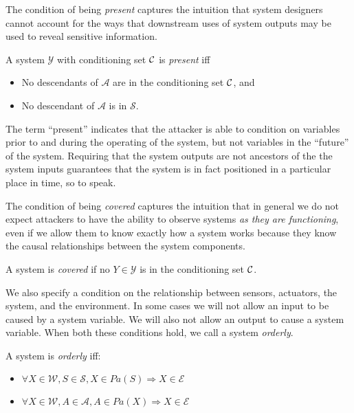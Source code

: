 \documentclass[../thesis.tex]{subfiles}
\begin{document}
The condition of being \emph{present} captures the
intuition that system designers cannot account for
the ways that downstream uses of system outputs
may be used to reveal sensitive information.

\begin{dfn}[Present]
  A system $\mathcal{Y}$ with conditioning set $\mathcal{C}$ is \emph{present}
   iff
  \begin{itemize}
  \item No descendants of $\mathcal{A}$ are in the
    conditioning set $\mathcal{C}$, and
  \item No descendant of $\mathcal{A}$ is in
    $\mathcal{S}$.
  \end{itemize}
\end{dfn}

The term ``present'' indicates that the attacker
is able to condition on variables prior to and
during the operating of the system, but not
variables in the ``future'' of the system.
Requiring that the system outputs are not ancestors of
the the system inputs guarantees that the system is
in fact positioned in a particular place in time,
so to speak.

The condition of being \emph{covered} captures the intuition
that in general we do not expect attackers to have
the ability to observe systems 
\emph{as they are functioning}, even if we allow them
to know exactly how a system works because
they know the causal relationships between the
system components.

\begin{dfn}[Covered]
  \label{def:covered-system}
  A system is \emph{covered} if no $Y \in \mathcal{Y}$
  is in the conditioning set $\mathcal{C}$.
\end{dfn}

%
%

We also specify a condition on the relationship
between sensors, actuators, the system, and the environment.
In some cases we will not allow an input to be caused
by a system variable.
We will also not allow an output to cause a system variable.
When both these conditions hold, we call a system \emph{orderly}.

\begin{dfn}[Orderly]
  \label{def:orderly-system}
  A system is \emph{orderly} iff:
  \begin{itemize}
  \item $\forall X \in \mathcal{W}, S \in \mathcal{S}, X \in Pa(S) \Longrightarrow X \in \mathcal{E}$
  \item $\forall X \in \mathcal{W}, A \in \mathcal{A}, A \in Pa(X) \Longrightarrow X \in \mathcal{E}$
  \end{itemize}
\end{dfn}
\end{document}
